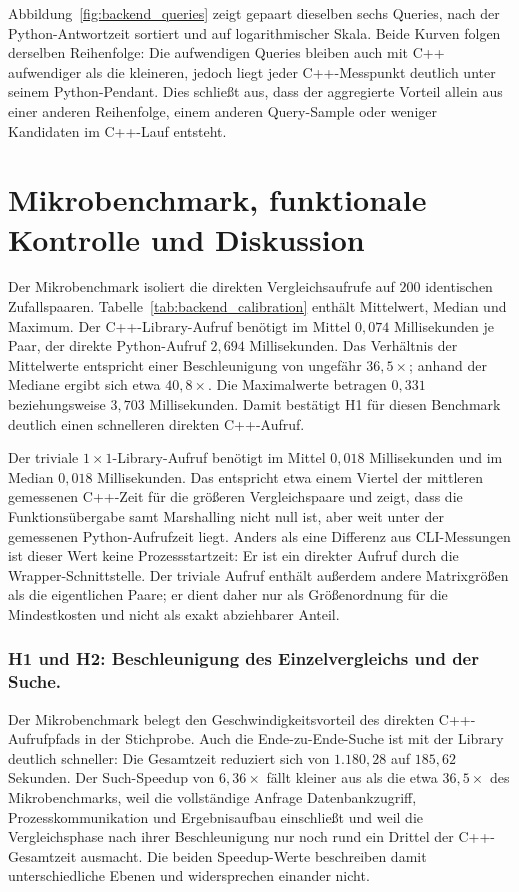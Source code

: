 \documentclass[a4paper,12pt, twoside]{report}
\theoremstyle{definition}
\begin{document}
Abbildung~\ref{fig:backend_queries} zeigt gepaart dieselben sechs Queries, nach der Python-Antwortzeit sortiert und auf logarithmischer Skala. Beide Kurven folgen derselben Reihenfolge: Die aufwendigen Queries bleiben auch mit C++ aufwendiger als die kleineren, jedoch liegt jeder C++-Messpunkt deutlich unter seinem Python-Pendant. Dies schließt aus, dass der aggregierte Vorteil allein aus einer anderen Reihenfolge, einem anderen Query-Sample oder weniger Kandidaten im C++-Lauf entsteht.

\section{Mikrobenchmark, funktionale Kontrolle und Diskussion}
\label{sec:backend_diskussion}

Der Mikrobenchmark isoliert die direkten Vergleichsaufrufe auf $200$ identischen Zufallspaaren. Tabelle~\ref{tab:backend_calibration} enthält Mittelwert, Median und Maximum. Der C++-Library-Aufruf benötigt im Mittel $0{,}074$ Millisekunden je Paar, der direkte Python-Aufruf $2{,}694$ Millisekunden. Das Verhältnis der Mittelwerte entspricht einer Beschleunigung von ungefähr $36{,}5\times$; anhand der Mediane ergibt sich etwa $40{,}8\times$. Die Maximalwerte betragen $0{,}331$ beziehungsweise $3{,}703$ Millisekunden. Damit bestätigt H1 für diesen Benchmark deutlich einen schnelleren direkten C++-Aufruf.

Der triviale $1\times1$-Library-Aufruf benötigt im Mittel $0{,}018$ Millisekunden und im Median $0{,}018$ Millisekunden. Das entspricht etwa einem Viertel der mittleren gemessenen C++-Zeit für die größeren Vergleichspaare und zeigt, dass die Funktionsübergabe samt Marshalling nicht null ist, aber weit unter der gemessenen Python-Aufrufzeit liegt. Anders als eine Differenz aus CLI-Messungen ist dieser Wert keine Prozessstartzeit: Er ist ein direkter Aufruf durch die Wrapper-Schnittstelle. Der triviale Aufruf enthält außerdem andere Matrixgrößen als die eigentlichen Paare; er dient daher nur als Größenordnung für die Mindestkosten und nicht als exakt abziehbarer Anteil.

\subsubsection{H1 und H2: Beschleunigung des Einzelvergleichs und der Suche.} Der Mikrobenchmark belegt den Geschwindigkeitsvorteil des direkten C++-Aufrufpfads in der Stichprobe. Auch die Ende-zu-Ende-Suche ist mit der Library deutlich schneller: Die Gesamtzeit reduziert sich von $1.180{,}28$ auf $185{,}62$ Sekunden. Der Such-Speedup von $6{,}36\times$ fällt kleiner aus als die etwa $36{,}5\times$ des Mikrobenchmarks, weil die vollständige Anfrage Datenbankzugriff, Prozesskommunikation und Ergebnisaufbau einschließt und weil die Vergleichsphase nach ihrer Beschleunigung nur noch rund ein Drittel der C++-Gesamtzeit ausmacht. Die beiden Speedup-Werte beschreiben damit unterschiedliche Ebenen und widersprechen einander nicht.
\end{document}
